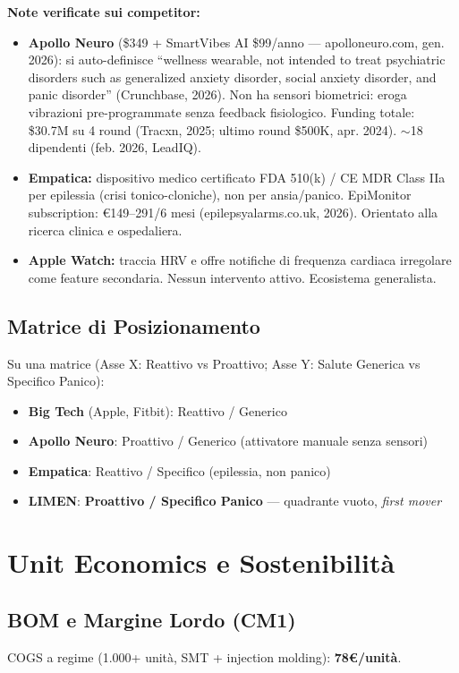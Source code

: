 \documentclass[12pt,a4paper]{article}
\begin{document}
\textbf{Note verificate sui competitor:}
\begin{itemize}
    \item \textbf{Apollo Neuro} (\$349 + SmartVibes AI \$99/anno --- apolloneuro.com, gen. 2026): si auto-definisce ``wellness wearable, not intended to treat psychiatric disorders such as generalized anxiety disorder, social anxiety disorder, and panic disorder'' (Crunchbase, 2026). Non ha sensori biometrici: eroga vibrazioni pre-programmate senza feedback fisiologico. Funding totale: \$30.7M su 4 round (Tracxn, 2025; ultimo round \$500K, apr. 2024). $\sim$18 dipendenti (feb. 2026, LeadIQ).
    \item \textbf{Empatica:} dispositivo medico certificato FDA 510(k) / CE MDR Class IIa per epilessia (crisi tonico-cloniche), non per ansia/panico. EpiMonitor subscription: €149--291/6 mesi (epilepsyalarms.co.uk, 2026). Orientato alla ricerca clinica e ospedaliera.
    \item \textbf{Apple Watch:} traccia HRV e offre notifiche di frequenza cardiaca irregolare come feature secondaria. Nessun intervento attivo. Ecosistema generalista.
\end{itemize}

\subsection{Matrice di Posizionamento}
Su una matrice (Asse X: Reattivo vs Proattivo; Asse Y: Salute Generica vs Specifico Panico):
\begin{itemize}
    \item \textbf{Big Tech} (Apple, Fitbit): Reattivo / Generico
    \item \textbf{Apollo Neuro}: Proattivo / Generico (attivatore manuale senza sensori)
    \item \textbf{Empatica}: Reattivo / Specifico (epilessia, non panico)
    \item \textbf{LIMEN}: \textbf{Proattivo / Specifico Panico} --- quadrante vuoto, \textit{first mover}
\end{itemize}

\section{Unit Economics e Sostenibilità}

\subsection{BOM e Margine Lordo (CM1)}
COGS a regime (1.000+ unità, SMT + injection molding): \textbf{78\euro/unità}.
\end{document}
